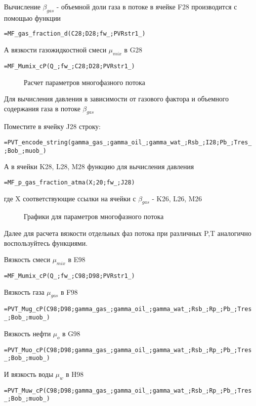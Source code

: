 Вычисление $\beta_{gas}$ - объемной доли газа в потоке в ячейке F28 производится с помощью функции

{ \small  \texttt{=MF\_gas\_fraction\_d(C28;D28;fw\_;PVRstr1\_)}}

А вязкости газожидкостной смеси $\mu_{mix}$ в G28

{ \small  \texttt{=MF\_Mumix\_cP(Q\_;fw\_;C28;D28;PVRstr1\_)}}

\begin{figure}[h!]
	\center{\texttt{[image: Ex30\_2]}}
	\caption{Расчет параметров многофазного потока}
	\label{ris:Ex30_2}
\end{figure}

Для вычисления давления в зависимости от газового фактора и объемного содержания газа в потоке $\beta_{gas}$

Поместите в ячейку J28 строку:

{ \small  \texttt{=PVT\_encode\_string(gamma\_gas\_;gamma\_oil\_;gamma\_wat\_;Rsb\_;I28;Pb\_;Tres\_;Bob\_;muob\_)}}

А в ячейки K28, L28, M28 функцию для вычисления давления 

{ \small  \texttt{=MF\_p\_gas\_fraction\_atma(X;20;fw\_;J28)}}

где X соответствующие ссылки на ячейки с $\beta_{gas}$ - K26, L26, M26

\begin{figure}[h!]
	\center{\texttt{[image: Ex30\_3]}}
	\caption{Графики для параметров многофазного потока}
	\label{ris:Ex30_3}
\end{figure}

Далее для расчета вязкости отдельных фаз потока при различных P,T аналогично воспользуйтесь функциями.

Вязкость смеси $\mu_{mix}$ в E98

{ \small  \texttt{=MF\_Mumix\_cP(Q\_;fw\_;C98;D98;PVRstr1\_)}}

Вязкость газа $\mu_{gas}$ в F98

{ \small  \texttt{=PVT\_Mug\_cP(C98;D98;gamma\_gas\_;gamma\_oil\_;gamma\_wat\_;Rsb\_;Rp\_;Pb\_;Tres\_;Bob\_;muob\_)}}

Вязкость нефти $\mu_{o}$ в G98

{ \small  \texttt{=PVT\_Muo\_cP(C98;D98;gamma\_gas\_;gamma\_oil\_;gamma\_wat\_;Rsb\_;Rp\_;Pb\_;Tres\_;Bob\_;muob\_)}}

И вязкость воды $\mu_{w}$ в H98

{ \small  \texttt{=PVT\_Muw\_cP(C98;D98;gamma\_gas\_;gamma\_oil\_;gamma\_wat\_;Rsb\_;Rp\_;Pb\_;Tres\_;Bob\_;muob\_)}}

